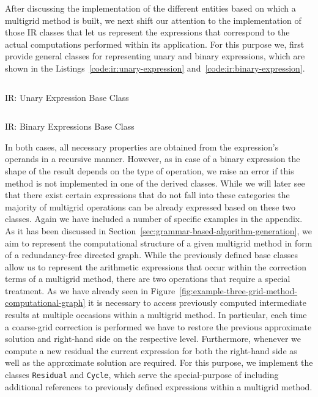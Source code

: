 After discussing the implementation of the different entities based on which a multigrid method is built, we next shift our attention to the implementation of those IR classes that let us represent the expressions that correspond to the actual computations performed within its application. 
For this purpose we, first provide general classes for representing unary and binary expressions, which are shown in the Listings~\ref{code:ir:unary-expression} and~\ref{code:ir:binary-expression}.
\begin{listing}
	\inputminted{python}{evostencils/ir/unary_expression.py}
	\caption{IR: Unary Expression Base Class}
	\label{code:ir:unary-expression}
\end{listing}
\begin{listing}
	\inputminted{python}{evostencils/ir/binary_expression.py}
	\caption{IR: Binary Expressions Base Class}
	\label{code:ir:binary-expression}
\end{listing}
In both cases, all necessary properties are obtained from the expression's operands in a recursive manner.
However, as in case of a binary expression the shape of the result depends on the type of operation, we raise an error if this method is not implemented in one of the derived classes. 
While we will later see that there exist certain expressions that do not fall into these categories the majority of multigrid operations can be already expressed based on these two classes.
Again we have included a number of specific examples in the appendix.
As it has been discussed in Section~\ref{sec:grammar-based-algorithm-generation}, we aim to represent the computational structure of a given multigrid method in form of a redundancy-free directed graph. 
While the previously defined base classes allow us to represent the arithmetic expressions that occur within the correction terms of a multigrid method, there are two operations that require a special treatment.
As we have already seen in Figure~\ref{fig:example-three-grid-method-computational-graph} it is necessary to access previously computed intermediate results at multiple occasions within a multigrid method.
In particular, each time a coarse-grid correction is performed we have to restore the previous approximate solution and right-hand side on the respective level.
Furthermore, whenever we compute a new residual the current expression for both the right-hand side as well as the approximate solution are required.
For this purpose, we implement the classes \texttt{Residual} and \texttt{Cycle}, which serve the special-purpose of including additional references to previously defined expressions within a multigrid method.
